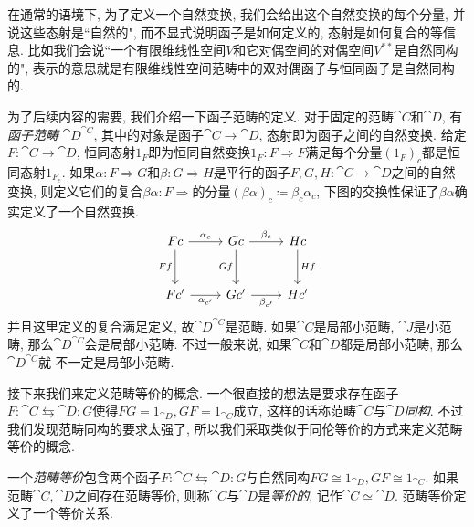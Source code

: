 在通常的语境下, 为了定义一个自然变换, 我们会给出这个自然变换的每个分量, 并说这些态射是``自然的", 而不显式说明函子是如何定义的, 态射是如何复合的等信息. 比如我们会说``一个有限维线性空间$V$和它对偶空间的对偶空间$V^{**}$是自然同构的", 表示的意思就是有限维线性空间范畴中的双对偶函子与恒同函子是自然同构的.


为了后续内容的需要, 我们介绍一下函子范畴的定义. 对于固定的范畴$\cat{C}$和$\cat{D}$, 有\emph{函子范畴} $\cat{D}^{\cat{C}}$, 其中的对象是函子$\cat{C}\to\cat{D}$, 态射即为函子之间的自然变换. 给定$F\colon \cat{C}\to \cat{D}$, 恒同态射$1_F$即为恒同自然变换$1_F\colon F\Rightarrow F$满足每个分量$(1_F)_c$都是恒同态射$1_{F_c}$. 如果$\alpha\colon F\Rightarrow G$和$\beta\colon G\Rightarrow H$是平行的函子$F, G, H\colon \cat{C}\to \cat{D}$之间的自然变换, 则定义它们的复合$\beta\alpha\colon F\Rightarrow$的分量$(\beta\alpha)_c\coloneq \beta_c\alpha_c$, 下图的交换性保证了$\beta\alpha$确实定义了一个自然变换.
\begin{equation*}
  \begin{tikzcd}[row sep=large]
    Fc & Gc & Hc\\
    Fc' & Gc' & Hc'
    \arrow[from=1-1,]{1-2}[above]{\alpha_c}
    \arrow[from=1-2,]{1-3}[above]{\beta_c}
    \arrow[from=2-1,]{2-2}[below]{\alpha_{c'}}
    \arrow[from=2-2,]{2-3}[below]{\beta_{c'}}
    \arrow[from=1-1,]{2-1}[left]{Ff}
    \arrow[from=1-2,]{2-2}[left]{Gf}
    \arrow[from=1-3,]{2-3}[right]{Hf}
  \end{tikzcd}
\end{equation*}
并且这里定义的复合满足定义, 故$\cat{D}^{\cat{C}}$是范畴. 如果$\cat{C}$是局部小范畴, $\cat{J}$是小范畴, 那么$\cat{D}^{\cat{C}}$会是局部小范畴. 不过一般来说, 如果$\cat{C}$和$\cat{D}$都是局部小范畴, 那么$\cat{D}^{\cat{C}}$就
不一定是局部小范畴.

接下来我们来定义范畴等价的概念. 一个很直接的想法是要求存在函子$F\colon \cat{C}\leftrightarrows \cat{D}\colon G$使得$FG=1_{\cat{D}}, GF=1_{\cat{C}}$成立, 这样的话称范畴$\cat{C}$与$\cat{D}$\emph{同构}. 不过我们发现范畴同构的要求太强了, 所以我们采取类似于同伦等价的方式来定义范畴等价的概念.

一个\emph{范畴等价}包含两个函子$F\colon \cat{C}\leftrightarrows \cat{D}\colon G$与自然同构$FG\cong 1_{\cat{D}}, GF\cong 1_{\cat{C}}$. 如果范畴$\cat{C}, \cat{D}$之间存在范畴等价, 则称$\cat{C}$与$\cat{D}$是\emph{等价的}, 记作$\cat{C}\simeq\cat{D}$. 范畴等价定义了一个等价关系.

